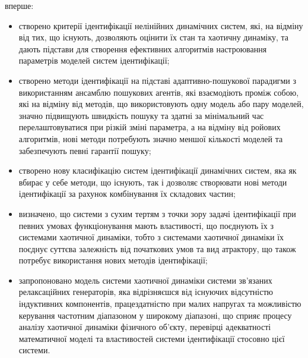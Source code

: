 \documentclass[a4paper,13pt]{atuaref}
\begin{document}
\noindent
вперше:
\\
\begin{itemize}

  \item
  створено критерії ідентифікації нелінійних динамічних систем,
  які, на відміну від тих, що існують, дозволяють оцінити їх стан та
  хаотичну динаміку, та дають підстави для створення ефективних алгоритмів
  настроювання параметрів моделей систем ідентифікації;

  \item
  створено методи ідентифікації на підставі
  адаптивно-пошукової парадигми з використанням ансамблю пошукових агентів,
  які взаємодіють проміж собою, які на відміну від методів, що використовують
  одну модель або пару моделей, значно підвищують швидкість пошуку та
  здатні за мінімальний час  перелаштовуватися при різкій зміні параметра, а на
  відміну від ройових алгоритмів, нові методи потребують значно меншої
  кількості моделей та забезпечують певні гарантії пошуку;

  \item
  створено нову класифікацію систем ідентифікації динамічних систем,
  яка як вбирає у себе методи, що існують, так і дозволяє
  створювати нові методи ідентифікації за рахунок
  комбінування їх складових частин;

  \item
   визначено, що системи з сухим тертям з точки зору задачі ідентифікації
   при певних  умовах функціонування
   мають властивості, що поєднують їх з системами хаотичної динаміки, тобто з
   системами хаотичної динаміки їх поєднує суттєва залежність від початкових
   умов та вид атрактору, що також потребує використання нових методів ідентифікації;

  \item
   запропоновано модель системи хаотичної динаміки системи зв'язаних релаксаційних генераторів,
   яка відрізняєшся від існуючих відсутністю індуктивних компонентів,
   працездатністю при малих напругах та можливістю
   керування частотним діапазоном у широкому діапазоні,
   що сприяє процесу аналізу хаотичної динаміки
   фізичного об'єкту, перевірці адекватності математичної моделі
   та властивостей системи ідентифікації стосовно цієї системи.
\end{itemize}
\end{document}
